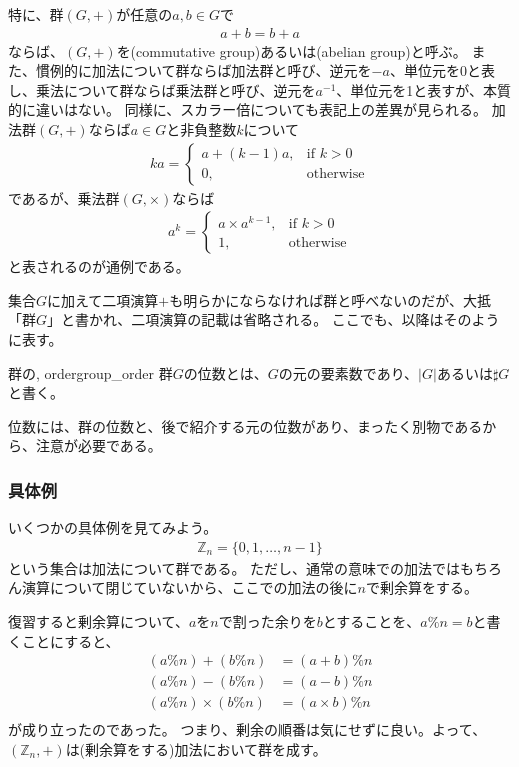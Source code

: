 特に、群$(G,+)$が任意の$a,b{\in}G$で
\begin{eqnarray*}
a + b = b + a
\end{eqnarray*}
ならば、$(G,+)$を(commutative group)あるいは(abelian group)と呼ぶ。
また、慣例的に加法について群ならば加法群と呼び、逆元を$-a$、単位元を0と表し、乗法について群ならば乗法群と呼び、逆元を$a^{-1}$、単位元を1と表すが、本質的に違いはない。
同様に、スカラー倍についても表記上の差異が見られる。
加法群$(G,+)$ならば$a\in{G}$と非負整数$k$について
\begin{eqnarray*}
ka=
\begin{cases}
a + (k-1)a, & \mbox{if } k > 0\\
0, & \mbox{otherwise}
\end{cases}
\end{eqnarray*}
であるが、乗法群$(G,\times)$ならば
\begin{eqnarray*}
a^{k}=
\begin{cases}
a \times a^{k-1}, & \mbox{if } k > 0\\
1, & \mbox{otherwise}
\end{cases}
\end{eqnarray*}
と表されるのが通例である。

集合$G$に加えて二項演算$+$も明らかにならなければ群と呼べないのだが、大抵「群$G$」と書かれ、二項演算の記載は省略される。
ここでも、以降はそのように表す。

\begin{Defi}{群の, order}{group_order}
群$G$の位数とは、$G$の元の要素数であり、$|G|$あるいは$\sharp G$と書く。
\end{Defi}

位数には、群の位数と、後で紹介する元の位数があり、まったく別物であるから、注意が必要である。

\subsubsection{具体例}
いくつかの具体例を見てみよう。
\begin{align*}
\mathbb{Z}_n = \{0,1, \ldots, n-1\}
\end{align*}
という集合は加法について群である。
ただし、通常の意味での加法ではもちろん演算について閉じていないから、ここでの加法の後に$n$で剰余算をする。

復習すると剰余算について、$a$を$n$で割った余りを$b$とすることを、$a \% n =b$と書くことにすると、
\begin{align*}
(a \% n) + (b \% n) &= (a + b) \% n\\
(a \% n) - (b \% n) &= (a - b) \% n\\
(a \% n) \times (b \% n) &= (a \times b) \% n\\
\end{align*}
が成り立ったのであった。
つまり、剰余の順番は気にせずに良い。よって、$(\mathbb{Z}_n,+)$は(剰余算をする)加法において群を成す。

